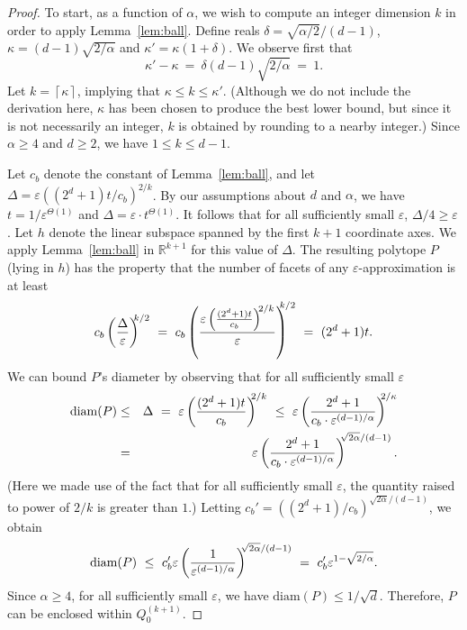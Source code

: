 \documentclass[11pt]{article}   \usepackage[letterpaper,hmargin=2.1cm,vmargin=3cm]{geometry}
\newcommand{\ceil}[1]{\left\lceil #1\right\rceil}
\newcommand{\RE}{\mathbb{R}}    \newcommand{\ZZ}{\mathbb{Z}}    \newcommand{\eps}{\varepsilon}  \newcommand{\ST}{\,:\,}         \newcommand{\sq}{\square}
\newcommand{\inv}[1]{\frac{1}{#1}}
\newcommand{\diam}{\mathrm{diam}}
\begin{document}
\begin{proof}
To start, as a function of $\alpha$, we wish to compute an integer dimension $k$ in order to apply Lemma~\ref{lem:ball}. Define reals $\delta = \sqrt{\alpha/2}/(d-1)$, $\kappa = (d-1)\sqrt{2/\alpha}$ and $\kappa' = \kappa(1+\delta)$. We observe first that
\[
	\kappa' - \kappa
		~  =  ~ \delta (d-1) \sqrt{2/\alpha}
		~  =  ~ 1.
\]
Let $k = \ceil{\kappa}$, implying that $\kappa \le k \le \kappa'$. (Although we do not include the derivation here, $\kappa$ has been chosen to produce the best lower bound, but since it is not necessarily an integer, $k$ is obtained by rounding to a nearby integer.) Since $\alpha \ge 4$ and $d \ge 2$, we have $1 \le k \le d-1$.

Let $c_b$ denote the constant of Lemma~\ref{lem:ball}, and let $\Delta = \eps((2^d+1)t/c_b)^{2/k}$. By our assumptions about $d$ and $\alpha$, we have $t = 1/\eps^{\Theta(1)}$ and $\Delta = \eps \cdot t^{\Theta(1)}$. It follows that for all sufficiently small $\eps$, $\Delta/4 \ge \eps$. Let $h$ denote the linear subspace spanned by the first $k+1$ coordinate axes. We apply Lemma~\ref{lem:ball} in $\RE^{k+1}$ for this value of $\Delta$. The resulting polytope $P$ (lying in $h$) has the property that the number of facets of any $\eps$-approximation is at least
\[
	c_b \left( \frac{\Delta}{\eps} \right)^{\NN k/2}	
		~  =  ~ c_b \left( \frac{ \eps \left( \frac{(2^d+1)t}{c_b} \right)^{\N 2/k} }{\eps} \right)^{\N\NN k/2}
		~  =  ~ (2^d + 1) t.
\]
We can bound $P$'s diameter by observing that for all sufficiently small $\eps$
\begin{eqnarray*}
	\diam(P)
		& \le & \Delta 
		~  =  ~ \eps \left( \frac{(2^d + 1)t}{c_b} \right)^{\NN 2/k}
		~ \le ~ \eps \left( \frac{2^d + 1}{c_b \cdot \eps^{(d-1)/\alpha}} \right)^{\NN 2/\kappa} \\
		&  =  & \eps \left( \frac{2^d + 1}{c_b \cdot \eps^{(d-1)/\alpha}} \right)^{\NN \sqrt{2\alpha}/(d-1)}.
\end{eqnarray*}
(Here we made use of the fact that for all sufficiently small $\eps$, the quantity raised to power of $2/k$ is greater than $1$.) Letting $c_b' = ((2^d + 1)/c_b)^{\sqrt{2\alpha}/(d-1)}$, we obtain
\[
	\diam(P) 
		~ \le ~ c_b' \eps \left( \inv{\eps^{(d-1)/\alpha}} \right)^{\NN\sqrt{2\alpha}/(d-1)}
		~  =  ~ c_b' \eps^{1-\sqrt{2/\alpha}}.
\]
Since $\alpha \ge 4$, for all sufficiently small $\eps$, we have $\diam(P) \le 1/\sqrt{d}$. Therefore, $P$ can be enclosed within $Q_0^{(k+1)}$.


\end{proof}
\end{document}
